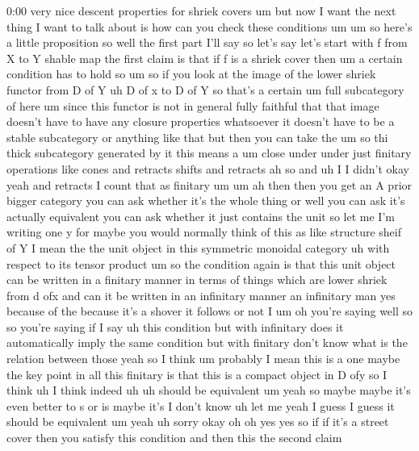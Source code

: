 \begin{unfinished}{0:00}
very  nice  descent  properties  for  shriek
covers  um  but  now  I  want  the  next  thing
I  want  to  talk  about  is  how  can  you
check  these
conditions
um
um  so  here's  a  little
proposition  so  well  the  first  part  I'll
say  so  let's  say  let's  start  with  f  from
X  to  Y  shable
map  the  first  claim  is  that  if  f  is  a
shriek
cover  then  um  a  certain  condition  has  to
hold  so  um
so  if  you  look  at  the  image  of  the  lower
shriek
functor  from  D  of  Y  uh  D  of  x  to  D  of
Y  so  that's  a  certain  um  full
subcategory  of  here  um  since  this
functor  is  not  in  general  fully  faithful
that  that  image  doesn't  have  to  have  any
closure  properties  whatsoever  it  doesn't
have  to  be  a  stable  subcategory  or
anything  like  that  but  then  you  can  take
the  um  so  thi  thick  subcategory
generated  by  it  this  means
a  um  close
under  under  just  finitary  operations
like  cones  and  retracts  shifts  and
retracts  ah  so  and  uh  I  I  didn't  okay
yeah  and  retracts  I  count  that  as
finitary
um  um  ah  then  then  you  get  an  A  prior
bigger  category  you  can  ask  whether  it's
the  whole  thing  or  well  you  can  ask  it's
actually  equivalent  you  can  ask  whether
it  just  contains  the  unit  so  let  me  I'm
writing  one  y  for  maybe  you  would
normally  think  of  this  as  like  structure
sheif  of  Y  I  mean  the  the  unit  object  in
this  symmetric  monoidal
category  uh  with  respect  to  its  tensor
product
um  so  the  condition  again  is  that  this
unit  object  can  be  written  in  a  finitary
manner  in  terms  of  things  which  are
lower  shriek  from  d  ofx  and  can  it  be
written  in  an  infinitary  manner  an
infinitary  man  yes  because  of  the
because  it's  a  shover  it  follows  or  not
I
um  oh  you're  saying  well  so  so  you're
saying  if  I  say  uh  this  condition  but
with  infinitary  does  it  automatically
imply  the  same  condition  but  with
finitary  don't  know  what  is  the  relation
between  those  yeah  so  I  think  um
probably  I  mean  this  is  a  one  maybe  the
key  point  in  all  this  finitary  is  that
this  is  a  compact  object  in  D  ofy  so  I
think  uh  I  think  indeed
uh  uh  should  be
equivalent
um  yeah  so  maybe  maybe  it's  even  better
to  s  or  is  maybe  it's  I  don't  know  uh
let
me  yeah  I  guess  I  guess  it  should  be
equivalent  um
yeah
uh  sorry
okay  oh  oh  yes  yes  so  if  if  it's  a
street  cover  then  you  satisfy  this
condition  and  then  this  the  second  claim

\end{unfinished}

